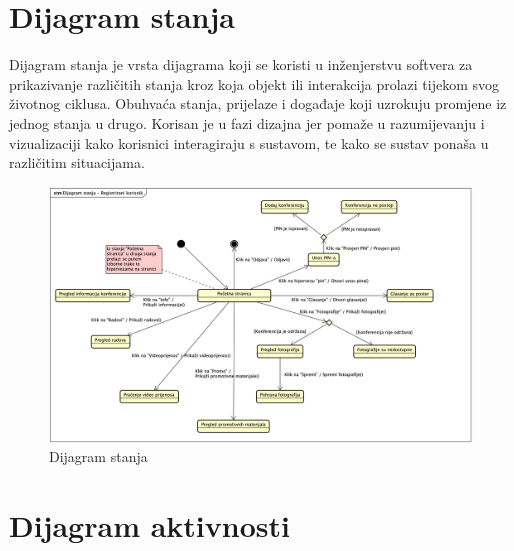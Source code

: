 			
			
			
			
			
			\eject
		
		\section{Dijagram stanja}
			
			

			Dijagram stanja je vrsta dijagrama koji se koristi u inženjerstvu softvera za prikazivanje različitih stanja kroz koja objekt ili interakcija prolazi tijekom svog životnog ciklusa. Obuhvaća stanja, prijelaze i događaje koji uzrokuju promjene iz jednog stanja u drugo. Korisan je u fazi dizajna jer pomaže u razumijevanju i vizualizaciji kako korisnici interagiraju s sustavom, te kako se sustav ponaša u različitim situacijama.
			
			\begin{figure}[H]
				\includegraphics[scale=0.4]{dijagrami/dijagram_stanja.png} %
				\centering
				\caption{Dijagram stanja}
				\label{fig:promjene3}
			\end{figure}			
			
			
			\eject 
		
		\section{Dijagram aktivnosti}
			
